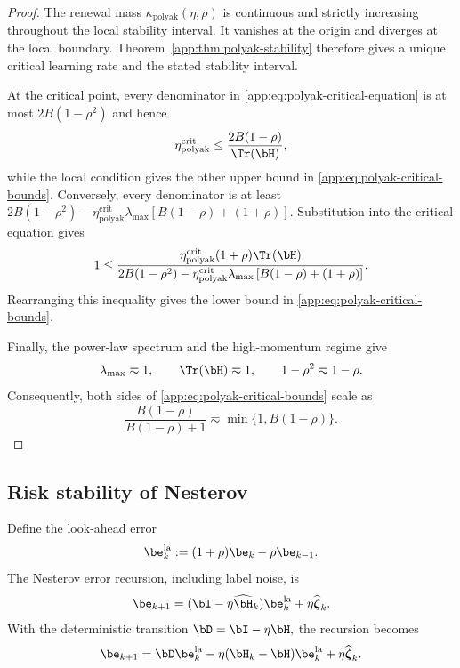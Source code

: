 \documentclass[11pt]{article}
\newcommand{\polyak}{\mathrm{polyak}}
\newcommand{\crit}{\mathrm{crit}}
\newcommand{\la}{\mathrm{la}}
\begin{document}
\begin{proof}
The renewal mass \(\kappa_{\polyak}(\eta,\rho)\) is continuous and strictly increasing throughout the local stability interval. It
vanishes at the origin and diverges at the local boundary. Theorem~\ref{app:thm:polyak-stability}
therefore gives a unique critical learning rate and the stated stability interval.

At the critical point, every denominator in
\eqref{app:eq:polyak-critical-equation} is at most
\(2B(1-\rho^2)\)
and hence
\[
\eta_{\polyak}^{\crit}
\leq
\frac{2B(1-\rho)}{\Tr(\bH)},
\]
while the local condition gives the other upper bound in
\eqref{app:eq:polyak-critical-bounds}. Conversely, every denominator is at least
\(
2B(1-\rho^2)
-
\eta_{\polyak}^{\crit}\lambda_{\max}
\left[B(1-\rho)+(1+\rho)\right].
\)
Substitution into the critical equation gives
\[
1
\leq
\frac{
\eta_{\polyak}^{\crit}(1+\rho)\Tr(\bH)
}{
2B(1-\rho^2)
-
\eta_{\polyak}^{\crit}\lambda_{\max}
\left[B(1-\rho)+(1+\rho)\right]
}.
\]
Rearranging this inequality gives the lower bound in
\eqref{app:eq:polyak-critical-bounds}.

Finally, the power-law spectrum and the high-momentum regime give
\[
\lambda_{\max}\eqsim1,
\qquad
\Tr(\bH)\eqsim1,
\qquad
1-\rho^2\eqsim1-\rho.
\]
Consequently, both sides of \eqref{app:eq:polyak-critical-bounds} scale as
\[
\frac{B(1-\rho)}{B(1-\rho)+1}
\eqsim
\min\{1,B(1-\rho)\}.
\]
\end{proof}

\subsection{Risk stability of Nesterov}
\label{app:subsec:nesterov-stability}

Define the look-ahead error
\[
\be_k^{\la}
:=
(1+\rho)\be_k-\rho\be_{k-1}.
\]
The Nesterov error recursion, including label noise, is
\begin{equation}
\label{app:eq:nesterov-stability-recursion}
\be_{k+1}
=
(\bI-\eta\widehat{\bH}_k)\be_k^{\la}
+
\eta\widehat{\boldsymbol\zeta}_k.
\end{equation}
With the deterministic transition
\(\bD=\bI-\eta\bH,\)
the recursion becomes
\[
\be_{k+1}
=
\bD\be_k^{\la}
-
\eta({\bH}_k-\bH)\be_k^{\la}
+
\eta\widehat{\boldsymbol\zeta}_k.
\]
\end{document}
